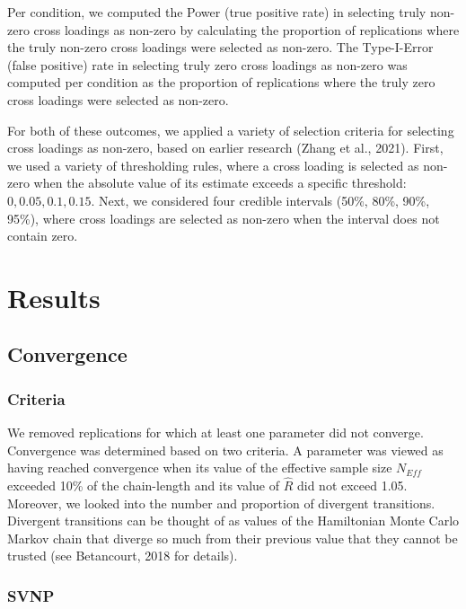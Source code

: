 \documentclass[
  man, donotrepeattitle,floatsintext]{apa6}
\begin{document}
Per condition, we computed the Power (true positive rate) in selecting
truly non-zero cross loadings as non-zero by calculating the proportion
of replications where the truly non-zero cross loadings were selected as
non-zero. The Type-I-Error (false positive) rate in selecting truly zero
cross loadings as non-zero was computed per condition as the proportion
of replications where the truly zero cross loadings were selected as
non-zero.

For both of these outcomes, we applied a variety of selection criteria
for selecting cross loadings as non-zero, based on earlier research
(Zhang et al., 2021). First, we used a variety of thresholding rules,
where a cross loading is selected as non-zero when the absolute value of
its estimate exceeds a specific threshold: \(0, 0.05, 0.1, 0.15\). Next,
we considered four credible intervals (50\%, 80\%, 90\%, 95\%), where cross
loadings are selected as non-zero when the interval does not contain
zero.

\hypertarget{results}{%
\section{Results}\label{results}}

\hypertarget{convergence}{%
\subsection{Convergence}\label{convergence}}

\hypertarget{criteria}{%
\subsubsection{Criteria}\label{criteria}}

We removed replications for which at least one parameter did not
converge. Convergence was determined based on two criteria. A parameter
was viewed as having reached convergence when its value of the effective
sample size \(N_{Eff}\) exceeded 10\% of the chain-length and its value of
\(\hat{R}\) did not exceed 1.05. Moreover, we looked into the number and
proportion of divergent transitions. Divergent transitions can be
thought of as values of the Hamiltonian Monte Carlo Markov chain that
diverge so much from their previous value that they cannot be trusted
(see Betancourt, 2018 for details).

\hypertarget{svnp}{%
\subsubsection{SVNP}\label{svnp}}
\end{document}
